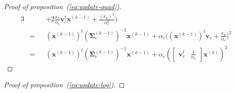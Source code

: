 \documentclass[journal,10pt]{IEEEtran}
\begin{document}
\begin{proof}[Proof of proposition~(\ref{eq:update-quad})]
\begin{alignat*}{3}
     & &&+ 2 \frac{x_k}{\alpha_c} \mathbf{v}_c^t \mathbf{x}^{(k-1)} + \frac{(x_k)^2}{\alpha_c^2}\Big) \\
     &= &&(\mathbf{x}^{(k-1)})^t (\boldsymbol{\Sigma}_c^{(k-1)})^{-1} \mathbf{x}^{(k-1)} + \alpha_c \Big( (\mathbf{x}^{(k-1)})^t \mathbf{v}_c + \frac{x_k}{\alpha_c} \Big)^2 \\
     &= &&(\mathbf{x}^{(k-1)})^t (\boldsymbol{\Sigma}_c^{(k-1)})^{-1} \mathbf{x}^{(k-1)} + \alpha_c ( \left[\begin{array}{cc} \mathbf{v}_c^t & \frac{1}{\alpha_c} \end{array}\right] \mathbf{x}^{(k)} )^2
    \end{alignat*}
\end{proof}

\begin{proof}[Proof of proposition~(\ref{eq:update-log})]


\end{proof}
\end{document}
